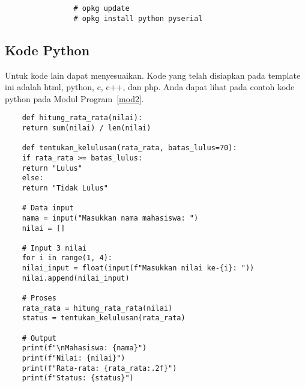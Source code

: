 			\begingroup
			\begin{singlespace}
			 \fontsize{10pt}{12pt}\selectfont
			\begin{verbatim}
				# opkg update
				# opkg install python pyserial
			\end{verbatim} 
			\end{singlespace}
			\endgroup			

\subsection{Kode Python}
Untuk kode lain dapat menyesuaikan. Kode yang telah disiapkan pada template ini adalah html, python, c, c++, dan php. Anda dapat lihat pada contoh kode python pada Modul Program~\ref{mod2}.

\begin{code}
	\singlespacing
	\begin{verbatim}
	def hitung_rata_rata(nilai):
	return sum(nilai) / len(nilai)
	
	def tentukan_kelulusan(rata_rata, batas_lulus=70):
	if rata_rata >= batas_lulus:
	return "Lulus"
	else:
	return "Tidak Lulus"
	
	# Data input
	nama = input("Masukkan nama mahasiswa: ")
	nilai = []
	
	# Input 3 nilai
	for i in range(1, 4):
	nilai_input = float(input(f"Masukkan nilai ke-{i}: "))
	nilai.append(nilai_input)
	
	# Proses
	rata_rata = hitung_rata_rata(nilai)
	status = tentukan_kelulusan(rata_rata)
	
	# Output
	print(f"\nMahasiswa: {nama}")
	print(f"Nilai: {nilai}")
	print(f"Rata-rata: {rata_rata:.2f}")
	print(f"Status: {status}")
	
	\end{verbatim}
	\begin{center}
		\label{mod2} 
	\end{center}
\end{code}
			
			
\begin{comment}

\end{comment}